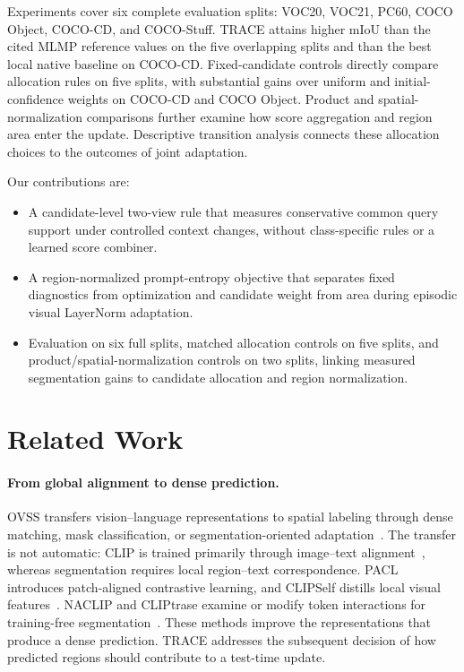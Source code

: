 \documentclass[letterpaper]{article}
\begin{document}
Experiments cover six complete evaluation splits: VOC20, VOC21, PC60, COCO Object, COCO-CD, and COCO-Stuff. TRACE attains higher mIoU than the cited MLMP reference values on the five overlapping splits and than the best local native baseline on COCO-CD. Fixed-candidate controls directly compare allocation rules on five splits, with substantial gains over uniform and initial-confidence weights on COCO-CD and COCO Object. Product and spatial-normalization comparisons further examine how score aggregation and region area enter the update. Descriptive transition analysis connects these allocation choices to the outcomes of joint adaptation.

Our contributions are:
\begin{itemize}
\item A candidate-level two-view rule that measures conservative common query support under controlled context changes, without class-specific rules or a learned score combiner.
\item A region-normalized prompt-entropy objective that separates fixed diagnostics from optimization and candidate weight from area during episodic visual LayerNorm adaptation.
\item Evaluation on six full splits, matched allocation controls on five splits, and product/spatial-normalization controls on two splits, linking measured segmentation gains to candidate allocation and region normalization.
\end{itemize}

\section{Related Work}
\paragraph{From global alignment to dense prediction.}
OVSS transfers vision--language representations to spatial labeling through dense matching, mask classification, or segmentation-oriented adaptation~\cite{ghiasi2022openseg,liang2023ovseg,cho2024catseg}. The transfer is not automatic: CLIP is trained primarily through image--text alignment~\cite{radford2021clip}, whereas segmentation requires local region--text correspondence. PACL introduces patch-aligned contrastive learning, and CLIPSelf distills local visual features~\cite{mukhoti2023pacl,wu2024clipself}. NACLIP and CLIPtrase examine or modify token interactions for training-free segmentation~\cite{hajimiri2025naclip,shao2024cliptrase}. These methods improve the representations that produce a dense prediction. TRACE addresses the subsequent decision of how predicted regions should contribute to a test-time update.
\end{document}
